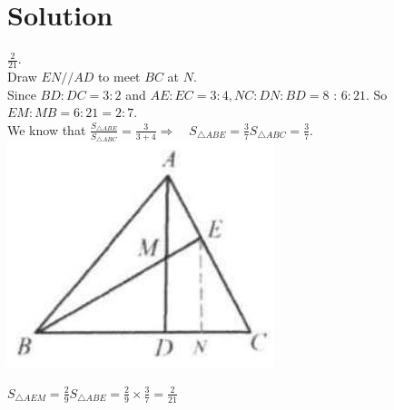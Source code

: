 \documentclass{article}
\begin{document}
\section*{Solution}
\(\frac{2}{21}\).\\
Draw \(E N / / A D\) to meet \(B C\) at \(N\).\\
Since \(B D: D C=3: 2\) and \(A E: E C=3: 4, N C: D N: B D=8\) : \(6: 21\). So \(E M: M B=6: 21=2: 7\).\\
We know that \(\frac{S_{\triangle A B E}}{S_{\triangle A B C}}=\frac{3}{3+4} \Rightarrow \quad S_{\triangle A B E}=\frac{3}{7} S_{\triangle A B C}=\frac{3}{7}\).\\
\centering
\includegraphics[width=\textwidth]{images/reasoning_image_1.jpg}


\(S_{\triangle A E M}=\frac{2}{9} S_{\triangle A B E}=\frac{2}{9} \times \frac{3}{7}=\frac{2}{21}\)
\end{document}
